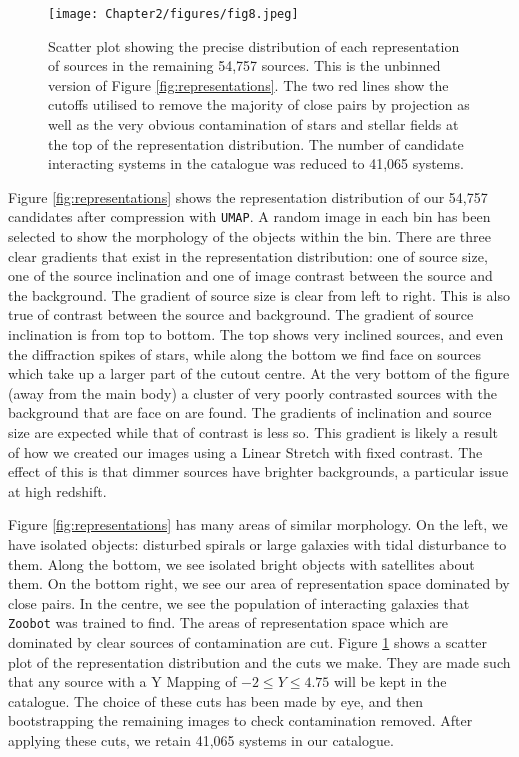 {\begin{figure}
  \centering
  \texttt{[image: Chapter2/figures/fig8.jpeg]}
  \caption[Scatter plot showing the precise distribution of each representation of sources in the remaining 54,757 sources.]{Scatter plot showing the precise distribution of each representation of sources in the remaining 54,757 sources. This is the unbinned version of Figure \ref{fig:representations}. The two red lines show the cutoffs utilised to remove the majority of close pairs by projection as well as the very obvious contamination of stars and stellar fields at the top of the representation distribution. The number of candidate interacting systems in the catalogue was reduced to 41,065 systems.}
  \label{fig:cuts-visual}
\end{figure}

Figure \ref{fig:representations} shows the representation distribution of our 54,757 candidates after compression with \texttt{UMAP}. A random image in each bin has been selected to show the morphology of the objects within the bin. There are three clear gradients that exist in the representation distribution: one of source size, one of the source inclination and one of image contrast between the source and the background. The gradient of source size is clear from left to right. This is also true of contrast between the source and background. The gradient of source inclination is from top to bottom. The top shows very inclined sources, and even the diffraction spikes of stars, while along the bottom we find face on sources which take up a larger part of the cutout centre. At the very bottom of the figure (away from the main body) a cluster of very poorly contrasted sources with the background that are face on are found. The gradients of inclination and source size are expected while that of contrast is less so. This gradient is likely a result of how we created our images using a Linear Stretch with fixed contrast. The effect of this is that dimmer sources have brighter backgrounds, a particular issue at high redshift.

Figure \ref{fig:representations} has many areas of similar morphology. On the left, we have isolated objects: disturbed spirals or large galaxies with tidal disturbance to them. Along the bottom, we see isolated bright objects with satellites about them. On the bottom right, we see our area of representation space dominated by close pairs. In the centre, we see the population of interacting galaxies that \texttt{Zoobot} was trained to find. The areas of representation space which are dominated by clear sources of contamination are cut. Figure \ref{fig:cuts-visual} shows a scatter plot of the representation distribution and the cuts we make. They are made such that any source with a Y Mapping of $-2 \leq Y \leq 4.75$ will be kept in the catalogue. The choice of these cuts has been made by eye, and then bootstrapping the remaining images to check contamination removed. After applying these cuts, we retain 41,065 systems in our catalogue.

}
